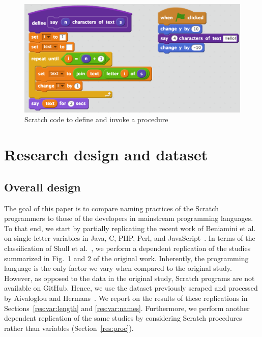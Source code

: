 \documentclass[conference]{IEEEtran}
\begin{document}
\begin{figure}
  \begin{center}
  \includegraphics[scale=0.28]{fig/procedures2.png}
  \caption{Scratch code to define and invoke a procedure}
  \label{fig:procedures}
  \end{center}
\end{figure} 


\section{Research design and dataset}
\subsection{Overall design}
\label{sec:design}
The goal of this paper is to compare naming practices of the Scratch programmers to those of the developers in mainstream programming languages. To that end, we start by partially replicating the recent work of Beniamini et al. on single-letter variables in Java, C, PHP, Perl, and JavaScript~\cite{Beniamini}. 
In terms of the classification of Shull et al.~\cite{Shull2008}, we perform a dependent replication of the studies summarized in Fig.~1 and 2 of the original work.  
Inherently, the programming language is the only factor we vary when compared to the original study. 
However, as opposed to the data in the original study, Scratch programs are not available on GitHub. 
Hence, we use the dataset previously scraped and processed by Aivaloglou and Hermans~\cite{Aivaloglou2016HowKC}. 
We report on the results of these replications in Sections~\ref{res:var:length} and \ref{res:var:names}.
%
Furthermore, we perform another dependent replication of the same studies by considering Scratch procedures rather than variables (Section~\ref{res:proc}).
\end{document}
